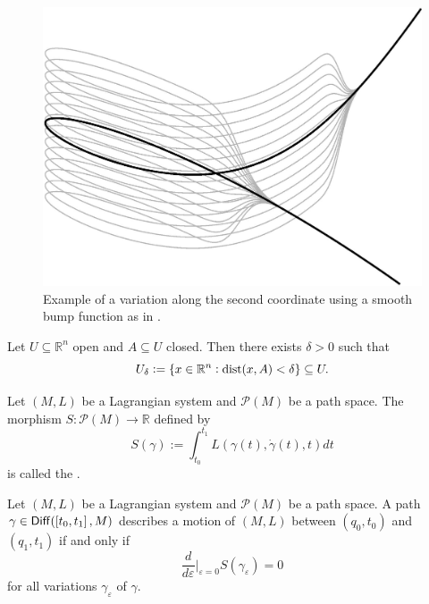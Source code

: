 \begin{example}
	\begin{figure}[h!tb]
		\centering
		\includegraphics[width = .7\textwidth]{variation.jpg}
		\caption{Example of a variation along the second coordinate using a smooth bump function as in \cite[42]{lee:smooth_manifolds:2013}.}
		\label{fig:variation}
	\end{figure}
\end{example}

\begin{exercise}
	\label{ex:U_delta_neighbourhood}
	Let $U \subseteq \mathbb{R}^n$ open and $A \subseteq U$ closed. Then there exists $\delta > 0$ such that
	\begin{equation*}
		U_\delta := \cbr[0]{x \in \mathbb{R}^n : \dist(x,A) < \delta} \subseteq U.
	\end{equation*}
\end{exercise}

\begin{definition}
	Let $(M,L)$ be a Lagrangian system and $\mathcal{P}(M)$ be a path space. The morphism $S : \mathcal{P}(M) \to \mathbb{R}$ defined by
	\begin{equation*}
		S(\gamma) := \int_{t_0}^{t_1} L(\gamma(t),\dot{\gamma}(t),t) dt
	\end{equation*}
	\noindent is called the .
\end{definition}

\begin{axiom}
	Let $(M,L)$ be a Lagrangian system and $\mathcal{P}(M)$ be a path space. A path $\gamma \in \mathsf{Diff}(\intcc[0]{t_0,t_1},M)$ describes a motion of $(M,L)$ between $(q_0,t_0)$ and $(q_1,t_1)$ if and only if 
	\begin{equation}
		\frac{d}{d\varepsilon}\bigg\vert_{\varepsilon = 0} S(\gamma_\varepsilon) = 0
	\end{equation}
	\noindent for all variations $\gamma_\varepsilon$ of $\gamma$.
\end{axiom}

